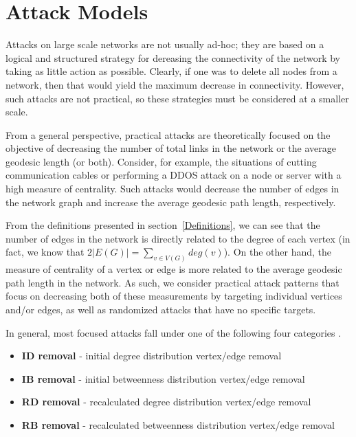 \documentclass[11pt]{article}
\begin{document}


\section{Attack Models}
\label{AttackStrategies}
Attacks on large scale networks are not usually ad-hoc; they are based on a logical and structured strategy for dereasing the connectivity of the network by taking as little action as possible. Clearly, if one was to delete all nodes from a network, then that would yield the maximum decrease in connectivity. However, such attacks are not practical, so these strategies must be considered at a smaller scale. 

From a general perspective, practical attacks are theoretically focused on the objective of decreasing the number of total links in the network or the average geodesic length (or both). Consider, for example, the situations of cutting communication cables or performing a DDOS attack on a node or server with a high measure of centrality. Such attacks would decrease the number of edges in the network graph and increase the average geodesic path length, respectively. 

From the definitions presented in section~\ref{Definitions}, we can see that the number of edges in the network is directly related to the degree of each vertex (in fact, we know that $2|E(G)| =\sum_{v \in V(G)}deg(v)$). On the other hand, the measure of centrality of a vertex or edge is more related to the average geodesic path length in the network. As such, we consider practical attack patterns that focus on decreasing both of these measurements by targeting individual vertices and/or edges, as well as randomized attacks that have no specific targets. 

In general, most focused attacks fall under one of the following four categories \cite{Attacks}.
\begin{itemize}
	\item \textbf{ID removal} - initial degree distribution vertex/edge removal
	\item \textbf{IB removal} - initial betweenness distribution vertex/edge removal
	\item \textbf{RD removal} - recalculated degree distribution vertex/edge removal
	\item \textbf{RB removal} - recalculated betweenness distribution vertex/edge removal
\end{itemize}
\end{document}
